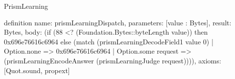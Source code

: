 \begin{lexlean}{PrismLearning}
\begin{semanticmodule}
definition{
  name: prismLearningDispatch,
  parameters: [value : Bytes],
  result: Bytes,
  body: (if (88 <? (Foundation.Bytes::byteLength value)) then 0x696e76616c6964 else (match (prismLearningDecodeField1 value 0)
    | Option.none => 0x696e76616c6964
    | Option.some request => (prismLearningEncodeAnswer (prismLearningJudge request)))),
  axioms: [Quot.sound, propext]
}
\end{semanticmodule}
\end{lexlean}
